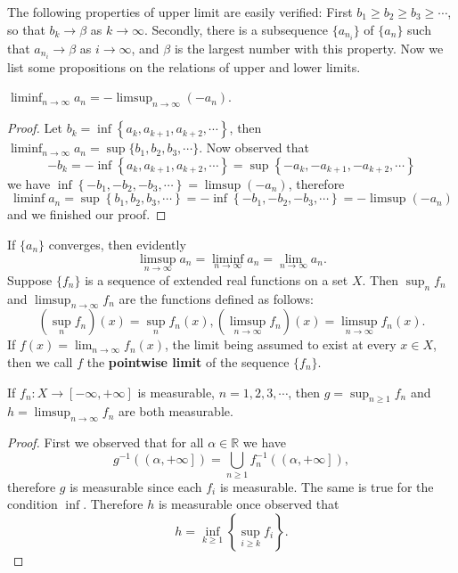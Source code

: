 The following properties of upper limit are easily verified: First $b_1\ge b_2\ge b_3\ge\cdots$, so that $b_k\to\beta$ as $k\to\infty$. Secondly, there is a subsequence $\{a_{n_i}\}$ of $\{a_n\}$ such that $a_{n_i}\to\beta$ as $i\to\infty$, and $\beta$ is the largest number with this property. Now we list some propositions on the relations of upper and lower limits.
\begin{proposition}
$\liminf_{n\to\infty}a_n=-\limsup_{n\to\infty}(-a_n).$
\end{proposition}
\begin{proof}
Let $b_k=\inf\left\{ a_k,a_{k+1},a_{k+2},\cdots \right\} $, then $\liminf_{n\to\infty}a_n=\sup\{b_1,b_2,b_3,\cdots\}$. Now observed that 
$$
-b_k=-\inf\left\{ a_k,a_{k+1},a_{k+2},\cdots \right\} =\sup\left\{ -a_k,-a_{k+1},-a_{k+2},\cdots \right\} 
$$
we have $\inf\left\{ -b_1,-b_2,-b_3,\cdots \right\} =\limsup\left( -a_n \right) $, therefore 
$$
\liminf a_n=\sup\left\{ b_1,b_2,b_3,\cdots \right\} =-\inf\left\{ -b_1,-b_2,-b_3,\cdots \right\} =-\limsup\left( -a_n \right) 
$$
and we finished our proof.
\end{proof}
If $\{a_n\}$ converges, then evidently 
$$\limsup_{n\to\infty}a_n=\liminf_{n\to\infty}a_n=\lim_{n\to\infty}a_n.$$
Suppose $\{f_n\}$ is a sequence of extended real functions on a set $X$. Then $\sup_nf_n$ and $\limsup_{n\to\infty}f_n$ are the functions defined as follows: 
$$
\left( \mathop {\mathrm{sup}} \limits_{n}f_n \right) \left( x \right) =\mathop {\mathrm{sup}} \limits_{n}f_n\left( x \right) ,\left( \limsup_{n\to\infty}f_n \right) \left( x \right) =\limsup_{n\to\infty}f_n\left( x \right) .
$$
If $f(x)=\lim_{n\to\infty}f_n(x)$, the limit being assumed to exist at every $x\in X$, then we call $f$ the \textbf{pointwise limit} of the sequence $\{f_n\}$.
\begin{theorem}
If $f_n:X\to[-\infty,+\infty]$ is measurable, $n=1,2,3,\cdots$, then $g=\sup_{n\ge 1}f_n$ and $h=\limsup_{n\to\infty}f_n$ are both measurable.
\end{theorem}
\begin{proof}
First we observed that for all $\alpha\in\mathbb{R}$ we have 
$$
g^{-1}\left( \left( \alpha ,+\infty \right] \right) =\bigcup_{n\ge 1}{f_{n}^{-1}\left( \left( \alpha ,+\infty \right] \right)},
$$
therefore $g$ is measurable since each $f_i$ is measurable. The same is true for the condition $\inf$. Therefore $h$ is measurable once observed that 
$$
h=\mathop {\mathrm{inf}} \limits_{k\ge 1}\left\{ \mathop {\mathrm{sup}} \limits_{i\ge k}f_i \right\} .
$$
\end{proof}
